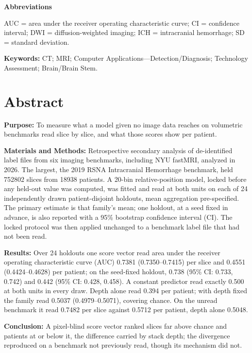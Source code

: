 \documentclass[11pt,letterpaper]{article}
\begin{document}
\textbf{Abbreviations}

AUC = area under the receiver operating characteristic curve;
CI = confidence interval;
DWI = diffusion-weighted imaging;
ICH = intracranial hemorrhage;
SD = standard deviation.

\vspace{0.4em}

\textbf{Keywords:} CT; MRI; Computer Applications---Detection/Diagnosis;
Technology Assessment; Brain/Brain Stem.

\clearpage

\section*{Abstract}

\textbf{Purpose:} To measure what a model given no image data reaches on
volumetric benchmarks read slice by slice, and what those scores show per patient.

\textbf{Materials and Methods:} Retrospective secondary analysis of
de-identified label files from six imaging benchmarks, including NYU fastMRI,
analyzed in 2026. The largest, the 2019 RSNA Intracranial Hemorrhage benchmark,
held \num{752802} slices from \num{18938} patients. A 20-bin relative-position model, locked before any held-out value
was computed, was fitted and read at both units on each of 24 independently drawn
patient-disjoint holdouts, mean aggregation pre-specified. The primary estimate is
that family's mean; one holdout, at a seed fixed in advance, is also reported with
a 95\% bootstrap confidence interval (CI). The locked protocol was then applied
unchanged to a benchmark label file that had not been read.

\textbf{Results:} Over 24 holdouts one score vector read area under the receiver
operating characteristic curve (AUC) 0.7381 (0.7350--0.7415) per slice and 0.4551
(0.4424--0.4628) per patient; on the seed-fixed holdout, 0.738 (95\% CI:
0.733, 0.742) and 0.442 (95\% CI: 0.428, 0.458). A constant predictor read exactly
0.500 at both units in every draw. Depth alone read 0.394 per patient; with depth fixed the family read 0.5037
(0.4979--0.5071), covering chance. On the unread benchmark it read 0.7482 per
slice against 0.5712 per patient, depth alone 0.5048.

\textbf{Conclusion:} A pixel-blind score vector ranked slices far above chance
and patients at or below it, the difference carried by stack depth; the
divergence reproduced on a benchmark not previously read, though its mechanism
did not.
\end{document}
